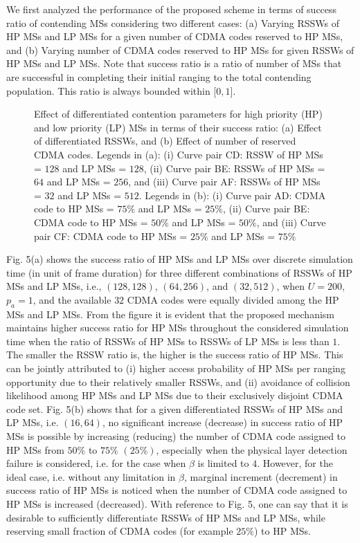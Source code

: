 \documentclass[preprint,12pt]{elsarticle}
\begin{document}
We first analyzed the performance of the proposed scheme in terms of success ratio of contending MSs considering two different cases: (a) Varying RSSWs of HP MSs and LP MSs for a given number of CDMA codes reserved to HP MSs, and (b) Varying number of CDMA codes reserved to HP MSs for given RSSWs of HP MSs and LP MSs. Note that success ratio is a ratio of number of MSs that are successful in completing their initial ranging to the total contending population. This ratio is always bounded within [$0, 1$].


\begin{figure}[h]
\centering
{}
\caption{Effect of differentiated contention parameters for high priority (HP) and low priority (LP) MSs in terms of their success ratio: (a) Effect of differentiated RSSWs, and (b) Effect of number of reserved CDMA codes. Legends in (a): (i) Curve pair CD: RSSW of HP MSs = $128$ and LP MSs = $128$, (ii) Curve pair BE: RSSWs of HP MSs = $64$ and LP MSs = $256$, and (iii) Curve pair AF: RSSWs of HP MSs = $32$ and LP MSs = $512$. Legends in (b): (i) Curve pair AD: CDMA code to HP MSs = $75\%$ and LP MSs = $25\%$, (ii) Curve pair BE: CDMA code to HP MSs = $50\%$ and LP MSs = $50\%$, and (iii) Curve pair CF: CDMA code to HP MSs = $25\%$ and LP MSs = $75\%$}
\end{figure}

Fig. 5(a) shows the success ratio of HP MSs and LP MSs over discrete simulation time (in unit of frame duration) for three different combinations of RSSWs of HP MSs and LP MSs, i.e., $(128, 128)$, $(64, 256)$, and $(32, 512)$, when $U = 200$,$p_a=1$, and the available $32$ CDMA codes were equally divided among the HP MSs and LP MSs. From the figure it is evident that the proposed mechanism maintains higher success ratio for HP MSs throughout the considered simulation time when the ratio of RSSWs of HP MSs to RSSWs of LP MSs is less than $1$. The smaller the RSSW ratio is, the higher is the success ratio of HP MSs. This can be jointly attributed to (i) higher access probability of HP MSs per ranging opportunity due to their relatively smaller RSSWs, and (ii) avoidance of collision likelihood among HP MSs and LP MSs due to their exclusively disjoint CDMA code set. Fig. 5(b) shows that for a given differentiated RSSWs of HP MSs and LP MSs, i.e. $(16, 64)$, no significant increase (decrease) in success ratio of HP MSs is possible by increasing (reducing) the number of CDMA code assigned to HP MSs from $50\%$ to $75\%$ $(25\%)$, especially when the physical layer detection failure is considered, i.e. for the case when $\beta$ is limited to $4$. However, for the ideal case, i.e. without any limitation in $\beta$, marginal increment (decrement) in success ratio of HP MSs is noticed when the number of CDMA code assigned to HP MSs is increased (decreased). With reference to Fig. 5, one can say that it is desirable to sufficiently differentiate RSSWs of HP MSs and LP MSs, while reserving small fraction of CDMA codes (for example $25\%$) to HP MSs.
\end{document}
